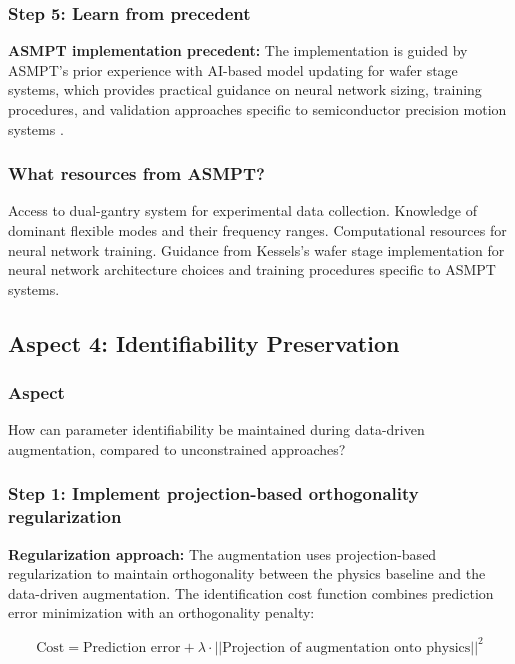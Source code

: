 \subsubsection{Step 5: Learn from precedent}

\textbf{ASMPT implementation precedent:}
The implementation is guided by ASMPT's prior experience with AI-based model updating for wafer stage systems, which provides practical guidance on neural network sizing, training procedures, and validation approaches specific to semiconductor precision motion systems \citep{kessels2025}.

\subsubsection{What resources from ASMPT?}

Access to dual-gantry system for experimental data collection. Knowledge of dominant flexible modes and their frequency ranges. Computational resources for neural network training. Guidance from Kessels's wafer stage implementation for neural network architecture choices and training procedures specific to ASMPT systems.





\subsection{Aspect 4: Identifiability Preservation}

\subsubsection*{Aspect}
How can parameter identifiability be maintained during data-driven augmentation, compared to unconstrained approaches?

\subsubsection{Step 1: Implement projection-based orthogonality regularization}

\textbf{Regularization approach:}
The augmentation uses projection-based regularization to maintain orthogonality between the physics baseline and the data-driven augmentation. The identification cost function combines prediction error minimization with an orthogonality penalty:

\begin{equation*}
\text{Cost} = \text{Prediction error} + \lambda \cdot ||\text{Projection of augmentation onto physics}||^2
\end{equation*}

